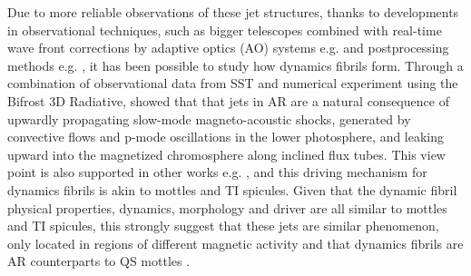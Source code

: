 \documentclass[12pt]{ociamthesis}
\begin{document}
%
Due to more reliable observations of these jet structures, thanks to developments in observational techniques, such as bigger telescopes combined with real-time wave front corrections by adaptive optics (AO) systems e.g. \citep{Scharmer2003SPIE4853370S,Rimmele2000SPIE4007218R} and postprocessing methods e.g. \citep{van2005SoPh228191V,von1993AA268374V}, it has been possible to study how dynamics fibrils form. Through a combination of observational data from SST and numerical experiment using the Bifrost 3D Radiative, \cite{Hansteen2006ApJ} showed that that jets in AR are a natural consequence of upwardly propagating slow-mode magneto-acoustic shocks, generated by convective flows and p-mode oscillations in the lower photosphere, and leaking upward into the magnetized chromosphere along inclined flux tubes. This view point is also supported in other works e.g. \citep{Heggland2007ApJ6661277H,De_Pontieu2007ApJ,Pontieu2004Natur,Suematsu1990LNP367211S}, and this driving mechanism for dynamics fibrils is akin to mottles and TI spicules. Given that the dynamic fibril physical properties, dynamics, morphology and driver are all similar to mottles and TI spicules, this strongly suggest that these jets are similar phenomenon, only located in regions of different magnetic activity and that dynamics fibrils are AR counterparts to QS mottles \citep{Rouppe2007ApJ660L169R}.
\end{document}
